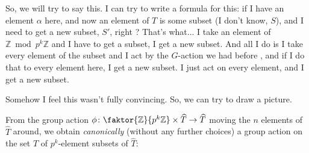 \begin{proofWrapper}
\begin{speech}[00:34:48 - 00:36:53]
So, we will try to say this. I can try to write a formula for this: if I have an element $\alpha$ here, and now an element of $T$ is some subset (I don't know, $S$), and I need to get a new subset, $S'$, right ? That's what... I take an element of $\mathbb{Z} \bmod p^k \mathbb{Z}$ and I have to get a subset, I get a new subset. And all I do is I take every element of the subset and I act by the $G$-action we had before , and if I do that to every element here, I get a new subset. I just act on every element, and I get a new subset.

Somehow I feel this wasn't fully convincing. So, we can try to draw a picture.
\end{speech}

\begin{content}
From the group action $\phi \colon \faktor{\mathbb{Z}}{p^k\mathbb{Z}} \times \widehat{T} \to \widehat{T}$ moving the $n$ elements of $\widehat{T}$ around, we obtain \emph{canonically} (without any further choices) a group action on the set $T$ of $p^k$-element subsets of $\widehat{T}$:


\end{content}
\end{proofWrapper}
